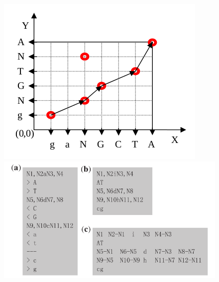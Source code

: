 \documentclass[acmtocl,acmnow]{article}
\begin{document}
\begin{figure}
\begin{minipage}{5cm}
    \begin{center}
      \includegraphics[height=\textwidth]{img/WaZhComSub.png}
    \end{center}
\end{minipage}
\begin{minipage}{5cm}
    \begin{center}
      \includegraphics[height=\textwidth]{img/WaZh2.png}

\end{center}
\end{minipage}
\end{figure}
\end{document}
